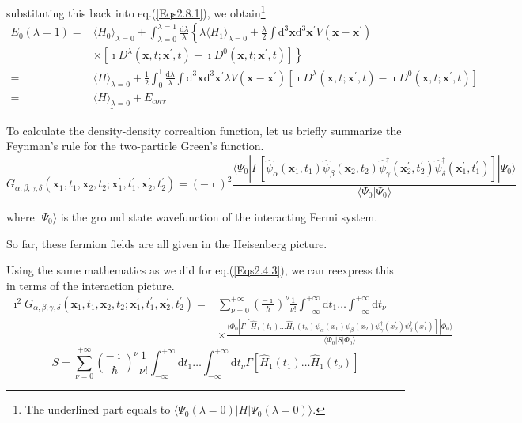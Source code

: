 substituting this back into eq.(\ref{Eqs2.8.1}), we obtain\footnote{The underlined part equals to $\langle \Psi_0(\lambda=0)|H|\Psi_0(\lambda=0)\rangle$.}
\begin{equation} \label{Eqs2.8.3} \begin{split}
E_0(\lambda=1) =& \langle H_0 \rangle_{\lambda=0} + \int_{\lambda=0}^{\lambda=1} \frac{\mathrm{d}\lambda}{\lambda} \left\{ 
\lambda\langle H_1 \rangle_{\lambda=0} + \frac{\lambda}{2}\int \mathrm{d}^3 \mathbf{x} \mathrm{d}^3 \mathbf{x}^{'} V(\mathbf{x}-\mathbf{x}^{'})\right. \\&\left.\times \left[ \imath D^\lambda(\mathbf{x},t;\mathbf{x}^{'},t)- \imath D^0(\mathbf{x},t;\mathbf{x}^{'},t)\right] \right\}\\
=& \langle H \rangle_{\lambda=0} + \frac{1}{2}\int_0^1 \frac{\mathrm{d}\lambda}{\lambda} \int \mathrm{d}^3 \mathbf{x} \mathrm{d}^3 \mathbf{x}^{'} \lambda V(\mathbf{x}-\mathbf{x}^{'})\left[ \imath D^\lambda(\mathbf{x},t;\mathbf{x}^{'},t)- \imath D^0(\mathbf{x},t;\mathbf{x}^{'},t) \right]\\
=&\underline{\langle H \rangle_{\lambda=0}} + E_{corr}
\end{split} \end{equation}

To calculate the density-density correaltion function, let us briefly summarize the Feynman's rule for the two-particle Green's function.
\begin{equation} \label{Eqs2.8.4}
G_{\alpha,\beta;\gamma,\delta}(\mathbf{x}_1,t_1,\mathbf{x}_2,t_2;\mathbf{x}_1^{'},t_1^{'},\mathbf{x}_2^{'},t_2^{'}) = (-\imath)^2 \frac{\langle \Psi_0 | \Gamma[\hat{\psi}_\alpha(\mathbf{x}_1,t_1) \hat{\psi}_\beta(\mathbf{x}_2, t_2) \hat{\psi}_\gamma^\dagger(\mathbf{x}_2^{'},t_2^{'}) \hat{\psi}_\delta^\dagger(\mathbf{x}_1^{'},t_1^{'})]|\Psi_0\rangle}{\langle \Psi_0 | \Psi_0 \rangle}
\end{equation}

where $| \Psi_0 \rangle$ is the ground state wavefunction of the interacting Fermi system.

So far, these fermion fields are all given in the Heisenberg picture.

Using the same mathematics as we did for eq.(\ref{Eqs2.4.3}), we can reexpress this in terms of the interaction picture.
\[ \begin{split} \imath^2 G_{\alpha,\beta;\gamma,\delta}(\mathbf{x}_1,t_1,\mathbf{x}_2,t_2;\mathbf{x}_1^{'},t_1^{'},\mathbf{x}_2^{'},t_2^{'}) =& \sum_{\nu=0}^{+\infty} \left( \frac{-\imath}{\hbar} \right)^\nu \frac{1}{\nu!} \int_{-\infty}^{+\infty}\mathrm{d}t_1 \ldots \int_{-\infty}^{+\infty}\mathrm{d}t_\nu \\
&\times \frac{\langle \Phi_0 | \Gamma[\hat{H}_1(t_1)\ldots\hat{H}_1(t_\nu)\psi_\alpha(x_1) \psi_\beta(x_2) \psi_\gamma^\dagger(x_2^{'}) \psi_\delta^\dagger(x_1^{'})]|\Phi_0\rangle}{\langle \Phi_0 | S | \Phi_0  \rangle}
\end{split} \]
\[ S = \sum_{\nu=0}^{+\infty}\left( \frac{-\imath}{\hbar} \right)^\nu \frac{1}{\nu!} \int_{-\infty}^{+\infty}\mathrm{d}t_1 \ldots \int_{-\infty}^{+\infty}\mathrm{d}t_\nu \Gamma[\hat{H}_1(t_1)\ldots\hat{H}_1(t_\nu)] \]

